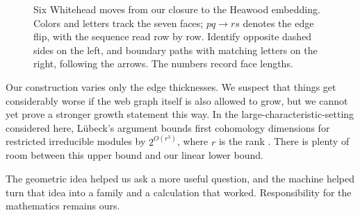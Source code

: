 \documentclass[a4paper,11pt]{amsart}
\numberwithin{equation}{subsection}
\theoremstyle{plain}
\theoremstyle{definition}
\theoremstyle{remark}
\begin{document}
\begin{figure}[htbp]
\caption{Six Whitehead moves from our closure to the Heawood embedding.
Colors and letters track the seven faces; $pq\to rs$ denotes
the edge flip, with the sequence read row by row.
Identify opposite dashed sides on the left, and boundary paths
with matching letters on the right, following the arrows.
The numbers record face lengths.}
\label{fig:heawood-moves}
\end{figure}

\begin{samepage}
\begin{remark}
Our construction varies only the edge thicknesses.
We suspect that things get considerably worse if the web
graph itself is also allowed to grow, but we cannot yet
prove a stronger growth statement this way.
In the large-characteristic-setting considered here,
L\"ubeck's argument bounds first cohomology dimensions
for restricted irreducible modules by $2^{O(r^3)}$,
where $r$ is the rank
\cite[Remark~(d) after Theorem~4.7]{Luebeck}.
There is plenty of room between this upper bound and
our linear lower bound.
\end{remark}
\end{samepage}

The geometric idea helped us ask a more useful question,
and the machine helped turn that idea into a family and
a calculation that worked. 
Responsibility for the mathematics remains ours.
\end{document}
